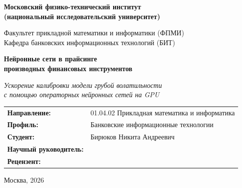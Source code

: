 \documentclass[12pt, a4paper]{article}
\begin{document}
\begin{titlepage}
\centering
\vspace*{1.5cm}

{\Large\textbf{Московский физико-технический институт\\
(национальный исследовательский университет)}}

\vspace{0.5cm}
{\large Факультет прикладной математики и информатики (ФПМИ)\\[4pt]
Кафедра банковских информационных технологий (БИТ)}

\vspace{2.5cm}

{\Huge\bfseries Нейронные сети в прайсинге\\
производных финансовых инструментов}

\vspace{1cm}
{\large\itshape Ускорение калибровки модели грубой волатильности\\
с помощью операторных нейронных сетей на GPU}

\vspace{2cm}

\begin{tabular}{ll}
\textbf{Направление:}          & 01.04.02 Прикладная математика и информатика \\[4pt]
\textbf{Профиль:}              & Банковские информационные технологии \\[4pt]
\textbf{Студент:}              & Бирюков Никита Андреевич \\[4pt]
\textbf{Научный руководитель:} & \hspace{0pt} \\[4pt]
\textbf{Рецензент:}            & \hspace{0pt} \\
\end{tabular}

\vfill

{\large Москва, 2026}
\end{titlepage}
\end{document}
